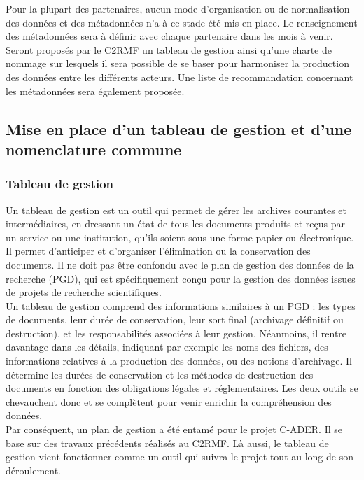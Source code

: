 Pour la plupart des partenaires, aucun mode d’organisation ou de normalisation des données et des métadonnées n’a à ce stade été mis en place. Le renseignement des métadonnées sera à définir avec chaque partenaire dans les mois à venir. Seront proposés par le C2RMF un tableau de gestion ainsi qu’une charte de nommage sur lesquels il sera possible de se baser pour harmoniser la production des données entre les différents acteurs. Une liste de recommandation concernant les métadonnées sera également proposée.

        \subsection{Mise en place d’un tableau de gestion et d’une nomenclature commune}

            \subsubsection{Tableau de gestion}

Un tableau de gestion est un outil qui permet de gérer les archives courantes et intermédiaires, en dressant un état de tous les documents produits et reçus par un service ou une institution, qu’ils soient sous une forme papier ou électronique. Il permet d’anticiper et d’organiser l’élimination ou la conservation des documents. Il ne doit pas être confondu avec le plan de gestion des données de la recherche (PGD), qui est spécifiquement conçu pour la gestion des données issues de projets de recherche scientifiques.\\

Un tableau de gestion comprend des informations similaires à un PGD : les types de documents, leur durée de conservation, leur sort final (archivage définitif ou destruction), et les responsabilités associées à leur gestion. Néanmoins, il rentre davantage dans les détails, indiquant par exemple les noms des fichiers, des informations relatives à la production des données, ou des notions d’archivage. Il détermine les durées de conservation et les méthodes de destruction des documents en fonction des obligations légales et réglementaires. Les deux outils se chevauchent donc et se complètent pour venir enrichir la compréhension des données.\\

Par conséquent, un plan de gestion a été entamé pour le projet C-ADER. Il se base sur des travaux précédents réalisés au C2RMF. Là aussi, le tableau de gestion vient fonctionner comme un outil qui suivra le projet tout au long de son déroulement.\\

